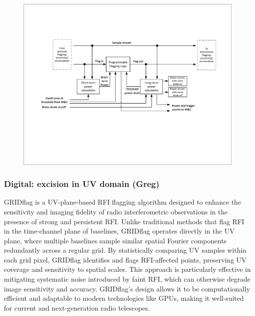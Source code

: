 \begin{figure}
    \centering
    \includegraphics[height=.28\textheight]{figures/RFI_DF_SKA_Mid_CBF.pdf}
    \caption{}
    \label{fig:rfi_df_ska_mid_cbf}
\end{figure}


\subsubsection{Digital: excision in UV domain (Greg)}

GRIDflag \cite{10464448} is a UV-plane-based RFI flagging algorithm designed to enhance the sensitivity and imaging fidelity of radio interferometric observations in the presence of strong and persistent RFI. Unlike traditional methods that flag RFI in the time-channel plane of baselines, GRIDflag operates directly in the UV plane, where multiple baselines sample similar spatial Fourier components redundantly across a regular grid. By statistically comparing UV samples within each grid pixel, GRIDflag identifies and flags RFI-affected points, preserving UV coverage and sensitivity to spatial scales. This approach is particularly effective in mitigating systematic noise introduced by faint RFI, which can otherwise degrade image sensitivity and accuracy. GRIDflag's design allows it to be computationally efficient and adaptable to modern technologies like GPUs, making it well-suited for current and next-generation radio telescopes.

